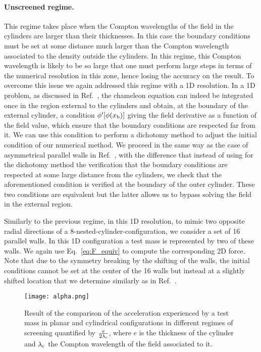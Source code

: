 \documentclass[aps,prd,twocolumn,superscriptaddress,nofootinbib,eqsecnumm,showpacs]{revtex4-1}
\renewcommand\({\left(}
\renewcommand\){\right)}
\renewcommand\[{\left[}
\renewcommand\]{\right]}
\begin{document}
\paragraph{Unscreened regime.}
This regime takes place when the Compton wavelengths of the field in the cylinders are larger than their thicknesses. In this case the boundary conditions must be set at some distance much larger than the Compton wavelength associated to the density outside the cylinders. In this regime, this Compton wavelength is likely to be so large that one must perform large steps in terms of the numerical resolution in this zone, hence losing the accuracy on the result. To overcome this issue we again addressed this regime with a 1D resolution. In a 1D problem, as discussed in Ref.~\cite{PRD1}, the chameleon equation can indeed be integrated once in the region external to the cylinders and obtain, at the boundary of the external cylinder, a condition $\phi'[\phi(x_{\rm b})]$ giving the field derivative as a function of the field value, which ensure that the boundary conditions are respected far from it.  We can use this condition to perform a dichotomy method to adjust the initial condition of our numerical method. We proceed in the same way as the case of asymmetrical parallel walls in Ref.~\cite{PRD2}, with the difference that instead of using for the dichotomy method the verification that the boundary conditions are respected at some large distance from the cylinders, we check that the aforementioned condition is verified at the boundary of the outer cylinder.  These two conditions are equivalent but the latter allows us to bypass  solving the field in the external region.

Similarly to the previous regime, in this 1D resolution, to mimic two opposite radial directions of a 8-nested-cylinder-configuration, we consider a set of 16 parallel walls. In this 1D configuration a test mass is represented by two of these walls. We again use Eq.~\eqref{eq:F_equiv} to compute the corresponding 2D force. Note that due to the symmetry breaking by the shifting of the walls, the initial conditions cannot be set at the center of the 16 walls but instead at a slightly shifted location that we determine similarly as in Ref.~\cite{PRD2}.

\vspace{.5cm}
\begin{figure}
\texttt{[image: alpha.png]}
\caption{Result of the comparison of the acceleration experienced by a test mass in planar and cylindrical configurations in different regimes of screening quantified by $\frac{e}{2 \lambda_{\rm c}}$, where $e$ is the thickness of the cylinder and $\lambda_{\rm c}$ the Compton wavelength of the field associated to it.}
\label{fig:alpha}
\end{figure}
\end{document}
